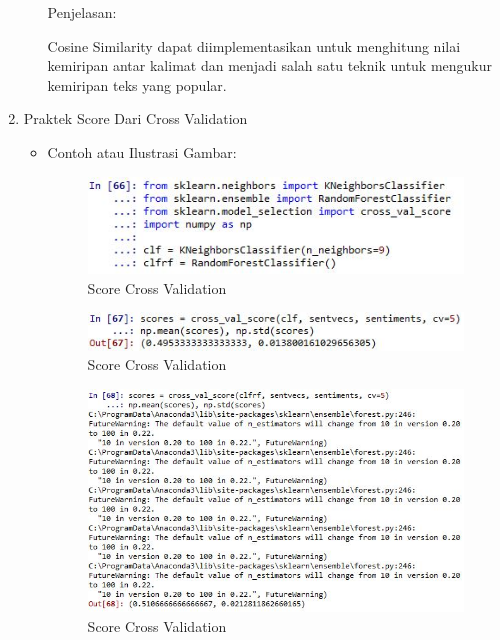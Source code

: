 \begin{enumerate}
\begin{itemize}
Penjelasan: 

Cosine Similarity dapat diimplementasikan untuk menghitung nilai kemiripan antar kalimat dan menjadi salah satu teknik untuk mengukur kemiripan  teks yang  popular. 

\end{itemize}

\item Praktek Score Dari Cross Validation
\begin{itemize}
\item Contoh atau Ilustrasi Gambar:

\begin{figure}[H]
\centering
\includegraphics[scale=0.7]{figures/1174051/5/56.jpg}
\caption{Score Cross Validation}
\label{Score Cross Validation}
\end{figure}

\begin{figure}[H]
\centering
\includegraphics[scale=0.7]{figures/1174051/5/57.jpg}
\caption{Score Cross Validation}
\label{Score Cross Validation}
\end{figure}

\begin{figure}[H]
\centering
\includegraphics[scale=0.7]{figures/1174051/5/58.jpg}
\caption{Score Cross Validation}
\label{Score Cross Validation}
\end{figure}


\end{itemize}
\end{enumerate}
